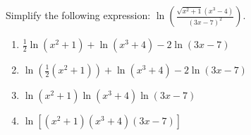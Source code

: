 \bigskip

\item Simplify the following expression: $\displaystyle \ln\left(\frac{\sqrt{x^2+1}(x^3-4)}{(3x-7)^2}\right)$.

\begin{enumerate}
\item $\displaystyle \frac{1}{2}\ln(x^2+1)+\ln(x^3+4)-2\ln(3x-7)$
\item $\displaystyle \ln\left(\frac{1}{2}(x^2+1)\right)+\ln(x^3+4)-2\ln(3x-7)$
\item $\displaystyle \ln(x^2+1)\ln(x^3+4)\ln(3x-7)$
\item $\displaystyle \ln[(x^2+1)(x^3+4)(3x-7)]$
\end{enumerate}

